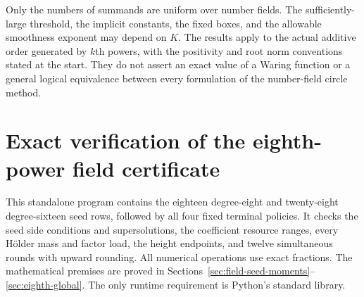 \documentclass[11pt,reqno]{amsart}
\numberwithin{equation}{section}
\theoremstyle{definition}
\begin{document}
Only the numbers of summands are uniform over number fields. The
sufficiently-large threshold, the implicit constants, the fixed boxes,
and the allowable smoothness exponent may depend on $K$. The results
apply to the actual additive order generated by $k$th powers, with the
positivity and root norm conventions stated at the start. They do not
assert an exact value of a Waring function or a general logical
equivalence between every formulation of the number-field circle method.


\appendix
\section{Exact verification of the eighth-power field certificate}
\label{app:eighth-field}
This standalone program contains the eighteen degree-eight and twenty-eight
degree-sixteen seed rows, followed by all four fixed terminal policies.
It checks the seed side conditions and supersolutions, the coefficient
resource ranges, every H\"older mass and factor load, the height endpoints,
and twelve simultaneous rounds with upward rounding. All numerical
operations use exact fractions. The mathematical premises are proved
in Sections~\ref{sec:field-seed-moments}--\ref{sec:eighth-global}.
The only runtime requirement is Python's standard library.
\end{document}
